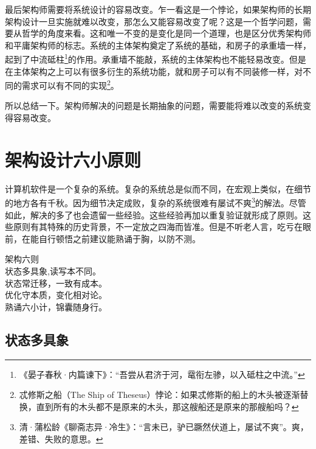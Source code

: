 最后架构师需要将系统设计的容易改变。乍一看这是一个悖论，如果架构师的长期架构设计一旦实施就难以改变，那怎么又能容易改变了呢？这是一个哲学问题，需要从哲学的角度来看。这和唯一不变的是变化是同一个道理，也是区分优秀架构师和平庸架构师的标志。系统的主体架构奠定了系统的基础，和房子的承重墙一样，起到了中流砥柱\footnote{《晏子春秋·内篇谏下》：“吾尝从君济于河，鼋衔左骖，以入砥柱之中流。”}的作用。承重墙不能敲，系统的主体架构也不能轻易改变。但是在主体架构之上可以有很多衍生的系统功能，就和房子可以有不同装修一样，对不同的需求可以有不同的实现\footnote{忒修斯之船（The Ship of Theseus）悖论：如果忒修斯的船上的木头被逐渐替换，直到所有的木头都不是原来的木头，那这艘船还是原来的那艘船吗？}。


所以总结一下。架构师解决的问题是长期抽象的问题，需要能将难以改变的系统变得容易改变。


\section{架构设计六小原则}

计算机软件是一个复杂的系统。复杂的系统总是似而不同，在宏观上类似，在细节的地方各有千秋。因为细节决定成败，复杂的系统很难有屡试不爽\footnote{清·蒲松龄《聊斋志异·冷生》：“言未已，驴已蹶然伏道上，屡试不爽”。爽，差错、失败的意思。}的解法。尽管如此，解决的多了也会遗留一些经验。这些经验再加以重复验证就形成了原则。这些原则有其特殊的历史背景，不一定放之四海而皆准。但是不听老人言，吃亏在眼前，在能自行顿悟之前建议能熟诵于胸，以防不测。

\begin{center}
    \begin{pinyinscope}
    架构六则\\
    状态多具象,读写本不同。\\
    状态常迁移，一致有成本。\\
    优化守本质，变化相对论。\\
    熟诵六小计，锦囊随身行。\\
    \end{pinyinscope}
\end{center}



\subsection{状态多具象}\label{statehasmultipleview}

